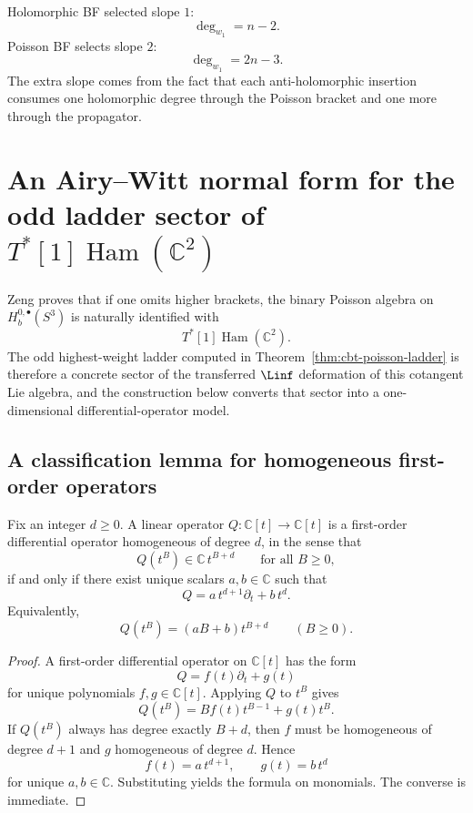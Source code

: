 \begin{remark}
\label{rem:cbt-slope-comparison}
Holomorphic BF selected slope $1$:
\[
\deg_{w_1}=n-2.
\]
Poisson BF selects slope $2$:
\[
\deg_{w_1}=2n-3.
\]
The extra slope comes from the fact that each anti-holomorphic insertion consumes one holomorphic degree through the Poisson bracket and one more through the propagator.
\end{remark}

\section{An Airy--Witt normal form for the odd ladder sector of \texorpdfstring{$T^*[1]\operatorname{Ham}(\mathbb{C}^2)$}{T*[1]Ham(C2)}}
\label{sec:cbt-airy-witt}

Zeng proves that if one omits higher brackets, the binary Poisson algebra on $H_b^{0,\bullet}(S^3)$ is naturally identified with
\[
T^*[1]\operatorname{Ham}(\mathbb{C}^2).
\]
The odd highest-weight ladder computed in Theorem~\ref{thm:cbt-poisson-ladder} is therefore a concrete sector of the transferred $\Linf$ deformation of this cotangent Lie algebra, and the construction below converts that sector into a one-dimensional differential-operator model.

\subsection{A classification lemma for homogeneous first-order operators}
\label{sec:cbt-classification-lemma}

\begin{proposition}
\label{prop:cbt-first-order-homogeneous}
\ClaimStatusProvedHere
Fix an integer $d\ge0$. A linear operator $Q:\mathbb{C}[t]\to\mathbb{C}[t]$ is a first-order differential operator homogeneous of degree $d$, in the sense that
\[
Q(t^B)\in \mathbb{C}\, t^{B+d}\qquad\text{for all }B\ge0,
\]
if and only if there exist unique scalars $a,b\in\mathbb{C}$ such that
\[
Q=a\,t^{d+1}\partial_t+b\,t^d.
\]
Equivalently,
\[
Q(t^B)=(aB+b)t^{B+d}\qquad (B\ge0).
\]
\end{proposition}

\begin{proof}
A first-order differential operator on $\mathbb{C}[t]$ has the form
\[
Q=f(t)\partial_t+g(t)
\]
for unique polynomials $f,g\in\mathbb{C}[t]$. Applying $Q$ to $t^B$ gives
\[
Q(t^B)=Bf(t)t^{B-1}+g(t)t^B.
\]
If $Q(t^B)$ always has degree exactly $B+d$, then $f$ must be homogeneous of degree $d+1$ and $g$ homogeneous of degree $d$. Hence
\[
f(t)=a\,t^{d+1},
\qquad
g(t)=b\,t^d
\]
for unique $a,b\in\mathbb{C}$. Substituting yields the formula on monomials. The converse is immediate.
\end{proof}

